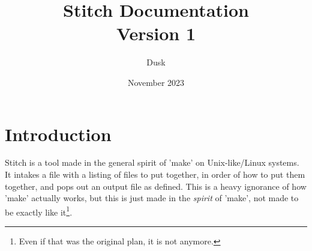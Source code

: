 \documentclass{report}
\title{Stitch Documentation \\ \large Version 1}
\author{Dusk}
\date{November 2023}
\begin{document}
\maketitle

\section*{Introduction}
\hspace{12pt}
Stitch is a tool made in the general spirit of 'make' on Unix-like/Linux systems. It intakes a file with a listing of files to put together, in order of how to put them together, and pops out an output file as defined. This is a heavy ignorance of how 'make' actually works, but this is just made in the \textit{spirit} of 'make', not made to be exactly like it\footnote{Even if that was the original plan, it is not anymore.}.
\end{document}
